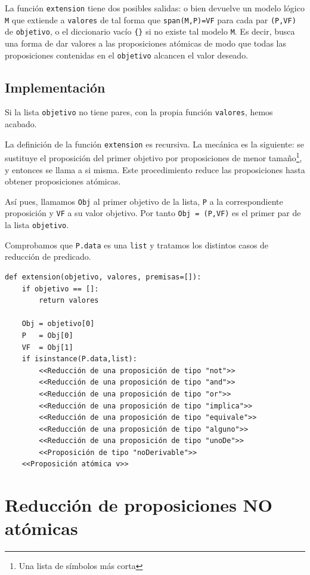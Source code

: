 \documentclass[10pt,a4paper]{report}
\begin{document}
La función \texttt{extension} tiene dos posibles salidas: 
o bien devuelve un modelo lógico \texttt{M} que extiende a \texttt{valores} de tal forma que \texttt{span(M,P)=VF} para cada par \texttt{(P,VF)} de \texttt{objetivo}, 
o el diccionario vacío \texttt{\{\}} si no existe tal modelo \texttt{M}. 
Es decir,
busca una forma de dar valores a las proposiciones atómicas de modo que todas las proposiciones contenidas en el \texttt{objetivo} alcancen el valor deseado.
\subsection{Implementación}
\label{sec:org525a4bc}

Si la lista \texttt{objetivo} no tiene pares, con la propia función \texttt{valores}, hemos acabado.

La definición de la función \texttt{extension} es recursiva. 
La mecánica es la siguiente: se sustituye el proposición del primer objetivo por proposiciones de menor tamaño\footnote{Una lista de símbolos más corta}, y entonces se llama a si misma. 
Este procedimiento reduce las proposiciones hasta obtener proposiciones atómicas.

Así pues, llamamos \texttt{Obj} al primer objetivo de la lista, \texttt{P} a la correspondiente proposición y \texttt{VF} a su valor objetivo. 
Por tanto \texttt{Obj = (P,VF)} es el primer par de la lista \texttt{objetivo}.

Comprobamos que \texttt{P.data} es una \texttt{list} y tratamos los distintos casos de reducción de predicado.

\label{Definición de la función extension}
\begin{verbatim}
def extension(objetivo, valores, premisas=[]):
    if objetivo == []:       
        return valores
    
    Obj = objetivo[0]         
    P   = Obj[0]
    VF  = Obj[1] 
    if isinstance(P.data,list):
        <<Reducción de una proposición de tipo "not">>
        <<Reducción de una proposición de tipo "and">>
        <<Reducción de una proposición de tipo "or">>
        <<Reducción de una proposición de tipo "implica">>
        <<Reducción de una proposición de tipo "equivale">>
        <<Reducción de una proposición de tipo "alguno">>                  
        <<Reducción de una proposición de tipo "unoDe">>
        <<Proposición de tipo "noDerivable">>
    <<Proposición atómica v>>
\end{verbatim}
\section{Reducción de proposiciones NO atómicas}
\label{sec:org5491645}
\end{document}
